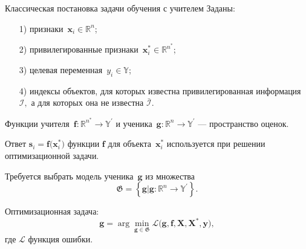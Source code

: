 \documentclass[10pt,pdf,hyperref={unicode}]{beamer}
\begin{document}

\begin{frame}{Классическая постановка задачи обучения с учителем}
\justifying
Заданы:
\begin{enumerate}
    \item[1)] признаки~$\mathbf{x}_i \in \mathbb{R}^{n}$;
    \item[2)] привилегированные признаки~$\mathbf{x}^*_i \in \mathbb{R}^{n^*}$;
    \item[3)] целевая переменная~$y_i \in \mathbb{Y}$;
    \item[4)] индексы объектов, для которых известна привилегированная информация $\mathcal{I},$ а для которых она не известна $\bar{\mathcal{I}}$.
\end{enumerate}

\bigskip

Функции учителя~$\mathbf{f}:\mathbb{R}^{n^*} \to \mathbb{Y}^\prime$ и ученика~$\mathbf{g}:\mathbb{R}^{n} \to \mathbb{Y}^\prime$ --- пространство оценок.

Ответ $\mathbf{s}_i = \mathbf{f}\bigr(\mathbf{x}_i^*\bigr)$ функции $\mathbf{f}$ для объекта~$\mathbf{x}^*_i$ используется при решении оптимизационной задачи.

\bigskip

Требуется выбрать модель ученика~$\mathbf{g}$ из множества
\[
	\mathfrak{G} = \left\{\mathbf{g}| \mathbf{g}:\mathbb{R}^{n} \to \mathbb{Y}^\prime\right\}.
\]

Оптимизационная задача:
\[
	\mathbf{g} = \arg\min_{\mathbf{g} \in \mathfrak{G}} \mathcal{L}\bigr(\mathbf{g}, \mathbf{f}, \mathbf{X}, \mathbf{X}^{*}, \mathbf{y}\bigr),
\]
где $\mathcal{L}$ функция ошибки.
\end{frame}
\end{document}
